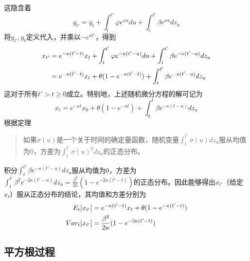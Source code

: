 \documentclass[UTF8]{ctexart}
\begin{document}
这隐含着
$$y_{t'}=y_t+\int_t^{t'}\varphi e^{\kappa u}du +\int_t^{t'}\beta e^{\kappa u}dz_u$$
将$y_{t'},y_t$定义代入，并乘以$-e^{\kappa t'}$，得到
\begin{align}	
x_{t'}
&=e^{-\kappa (t'-t)}x_t+\int_t^{t'}\varphi e^{-\kappa (t'-u)}du+\int_t^{t'}\beta e^{-\kappa (t'-u)}dz_u
 \notag \\
&=e^{-\kappa (t'-t)}x_t+\theta(1-e^{-\kappa (t'-t)})+\int_t^{t'}\beta e^{-\kappa (t'-u)}dz_u
\notag
\end{align}
这对于所有$t' > t \geqslant 0$成立。特别地，上述随机微分方程的解可记为
$$x_t=e^{-\kappa t}x_0+\theta(1-e^{-\kappa t})+\int_0^t \beta e^{-\kappa (t-u)}dz_u$$
根据定理
\begin{quote}
\kaishu
如果$\sigma(u)$是一个关于时间的确定量函数，随机变量$\int_t^{t'}\sigma(u) dz_u$服从均值为0，方差为$\int_t^{t'}\sigma(u)^2 dz_u$的正态分布。
\end{quote}
积分$\int_t^{t'}\beta e^{-\kappa (t'-u)}dz_u$服从均值为0，方差为$\int_t^{t'}\beta^2 e^{-2\kappa (t'-u)}dz_u=\frac{\beta^2}{2 \kappa}(1-e^{-2 \kappa(t'-t)})$的正态分布。因此能够得出$x_{t'}$（给定$x_t$）服从正态分布的结论，其均值和方差分别为
\begin{align}
E_t[x_{t'}] &= e^{-\kappa (t'-t)}x_t+\theta(1-e^{-\kappa (t'-t)}) \notag \\
Var_t[x_{t'}] &=\frac{\beta^2}{2 \kappa}(1-e^{-2 \kappa(t'-t)}) \notag
\end{align}
\subsection{平方根过程}
\end{document}
